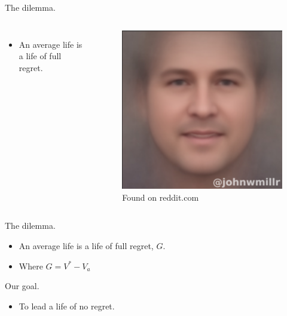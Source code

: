 \documentclass[10pt]{beamer}
\begin{document}
\begin{frame}[fragile]{The dilemma.}
\begin{columns}
\centering
\begin{itemize}
    \item An average life is a life of full regret.
\end{itemize}

\centering
\begin{figure}
    \centering
    \includegraphics[scale=0.4]{images/average_country_singer.png} 
    \caption{\footnotesize{Found on reddit.com}}
\end{figure}
\end{columns}
\end{frame}

\begin{frame}[fragile]{The dilemma.}
\begin{itemize}
    \item An average life is a life of full regret, $G$.
    \item Where $G = V^* - V_a$
\end{itemize}
\end{frame}

\begin{frame}[fragile]{Our goal.}
\begin{itemize}
    \item To lead a life of no regret.
\end{itemize}
\end{frame}
\end{document}
